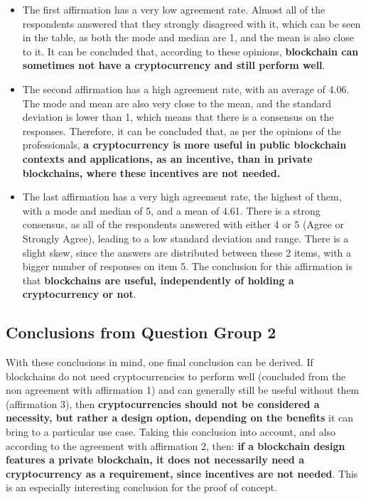 \begin{itemize}
    \item The first affirmation has a very low agreement rate. Almost all of the respondents answered that they strongly disagreed with it, which can be seen in the table, as both the mode and median are 1, and the mean is also close to it. It can be concluded that, according to these opinions, \textbf{blockchain can sometimes not have a cryptocurrency and still perform well}.
    \item The second affirmation has a high agreement rate, with an average of 4.06. The mode and mean are also very close to the mean, and the standard deviation is lower than 1, which means that there is a consensus on the responses. Therefore, it can be concluded that, as per the opinions of the professionals, \textbf{a cryptocurrency is more useful in public blockchain contexts and applications, as an incentive, than in private blockchains, where these incentives are not needed.}
    \item The last affirmation has a very high agreement rate, the highest of them, with a mode and median of 5, and a mean of 4.61. There is a strong consensus, as all of the respondents answered with either 4 or 5 (Agree or Strongly Agree), leading to a low standard deviation and range. There is a slight skew, since the answers are distributed between these 2 items, with a bigger number of responses  on item 5. The conclusion for this affirmation is that \textbf{blockchains are useful, independently of holding a cryptocurrency or not}.
\end{itemize}


\subsection*{Conclusions from Question Group 2}

With these conclusions in mind, one final conclusion can be derived. If blockchains do not need cryptocurrencies to perform well (concluded from the non agreement with affirmation 1) and can generally still be useful without them (affirmation 3), then \textbf{cryptocurrencies should not be considered a necessity, but rather a design option, depending on the benefits} it can bring to a particular use case. Taking this conclusion into account, and also according to the agreement with affirmation 2, then: \textbf{if a blockchain design features a private blockchain, it does not necessarily need a cryptocurrency as a requirement, since incentives are not needed}. This is an especially interesting conclusion for the proof of concept.

